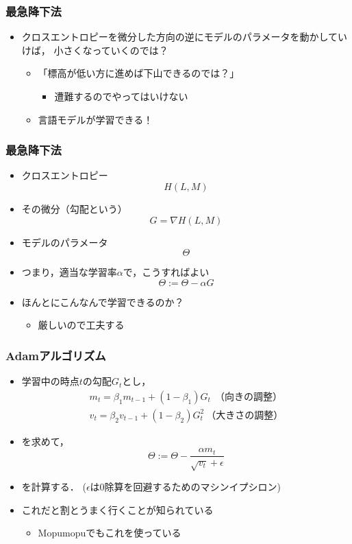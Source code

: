\documentclass[14pt]{beamer}
\begin{document}
\begin{frame}
	\frametitle{最急降下法}

	\begin{itemize}
		\item クロスエントロピーを微分した方向の逆にモデルのパラメータを動かしていけば，
			小さくなっていくのでは？
			\begin{itemize}
				\item 「標高が低い方に進めば下山できるのでは？」
					\begin{itemize}
						\item[] \hspace{5em} {\scriptsize \color{lightgray} 遭難するのでやってはいけない}
					\end{itemize}
				\item 言語モデルが学習できる！
			\end{itemize}
	\end{itemize}
\end{frame}

\begin{frame}
	\frametitle{最急降下法}

	\begin{itemize}
		\item クロスエントロピー \[ H(L, M) \]
		\item その微分（勾配という） \[ G = \nabla H(L, M) \]
		\item モデルのパラメータ \[ \Theta \]
		\item つまり，適当な学習率$\alpha$で，こうすればよい \[ \Theta := \Theta - \alpha G \]
		\item ほんとにこんなんで学習できるのか？
			\begin{itemize}
				\item 厳しいので工夫する
			\end{itemize}
	\end{itemize}
\end{frame}

\begin{frame}
	\frametitle{Adamアルゴリズム}

	\begin{itemize}
		\item 学習中の時点$t$の勾配$G_t$とし，
			\begin{align*}
				m_t = \beta_1 m_{t-1} + (1 - \beta_1) G_t \ \ \text{（向きの調整）}\\
				v_t = \beta_2 v_{t-1} + (1 - \beta_2) G_t^2 \ \text{（大きさの調整）}
			\end{align*}
		\item[] を求めて，
			\[
				\Theta := \Theta - \frac{\alpha m_t}{\sqrt{v_t} + \epsilon}
			\]
		\item[] を計算する． {\tiny ($\epsilon$は0除算を回避するためのマシンイプシロン)}
		\item これだと割とうまく行くことが知られている
			\begin{itemize}
				\item Mopumopuでもこれを使っている
			\end{itemize}
	\end{itemize}
\end{frame}
\end{document}
